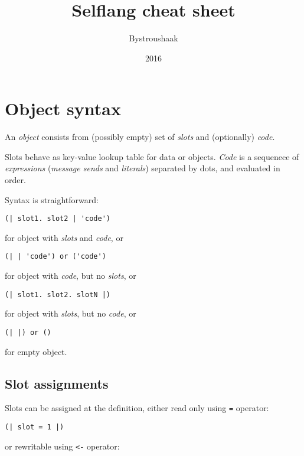 \documentclass[10pt]{article}
\title{Selflang cheat sheet}
\author{Bystroushaak}
\date{2016}
\renewcommand{\maketitle}{
    {\begin{center}\Large \mythetitle\end{center}}
}
\begin{document}
\begin{multicols*}{3}
\maketitle

\section{Object syntax}
An \textit{object} consists from (possibly empty) set of \textit{slots} and (optionally) \textit{code}.

Slots behave as key-value lookup table for data or objects. \textit{Code} is a sequenece of \textit{expressions} (\textit{message sends} and \textit{literals}) separated by dots, and evaluated in order.

Syntax is straightforward:

\begin{lstlisting}
(| slot1. slot2 | 'code')
\end{lstlisting}

for object with \textit{slots} and \textit{code}, or

\begin{lstlisting}
(| | 'code') or ('code')
\end{lstlisting}

for object with \textit{code}, but no \textit{slots}, or

\begin{lstlisting}
(| slot1. slot2. slotN |)
\end{lstlisting}

for object with \textit{slots}, but no \textit{code}, or

\begin{lstlisting}
(| |) or ()
\end{lstlisting}

for empty object.




\subsection{Slot assignments}
Slots can be assigned at the definition, either read only using \texttt{=} operator:

\begin{lstlisting}
(| slot = 1 |)
\end{lstlisting}

or rewritable using \texttt{<-} operator: %


\end{multicols*}
\end{document}
